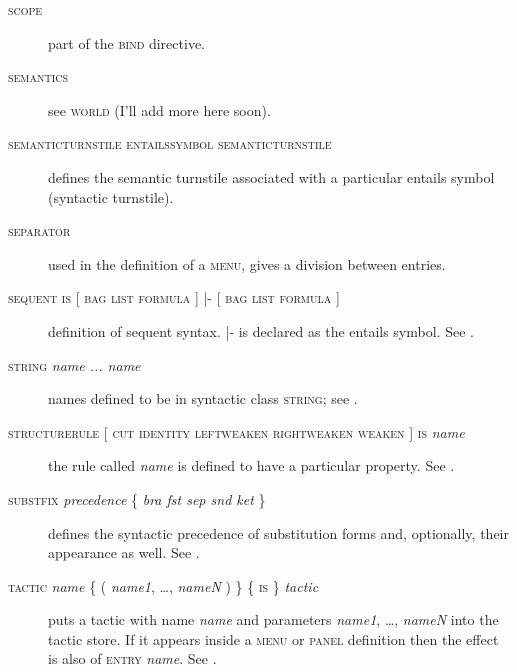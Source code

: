 \begin{description}
\item[\textsc{scope}] part of the \textsc{bind} directive.

\item[\textsc{semantics}] see \textsc{world} (I'll add more here soon).

\item[\textsc{semanticturnstile} \textsc{entailssymbol} \textsc{semanticturnstile}] defines the semantic turnstile associated with a particular entails symbol (syntactic turnstile).

\item[\textsc{separator}] used in the definition of a \textsc{menu}, gives a division between entries. %

\item[\textsc{sequent is} {[} \textsc{bag} {\textbar} \textsc{list} {\textbar} \textsc{formula} {]} |- {[} \textsc{bag} {\textbar} \textsc{list} {\textbar} \textsc{formula} {]}] definition of sequent syntax. |- is declared as the entails symbol. See .

\item[\textsc{string} \textit{name ... name}] names defined to be in syntactic class \textsc{string}; see .

\item[\textsc{structurerule} {[} \textsc{cut} {\textbar} \textsc{identity} {\textbar} \textsc{leftweaken} {\textbar} \textsc{rightweaken} {\textbar} \textsc{weaken} {]} \textsc{is} \textit{name}] the rule called \textit{name} is defined to have a particular property. See .

\item[\textsc{substfix} \textit{precedence} \{ \textit{bra fst sep snd ket} \}] defines the syntactic precedence of substitution forms and, optionally, their appearance as well. See .

\item[\textsc{tactic} \textit{name} \{ ( \textit{name1}, \dots, \textit{nameN} ) \} \{ \textsc{is} \} \textit{tactic}] puts a tactic with name \textit{name} and parameters \textit{name1}, \dots, \textit{nameN} into the tactic store. If it appears inside a \textsc{menu} or \textsc{panel} definition then the effect is also of \textsc{entry} \textit{name}.%
See .


\end{description}
